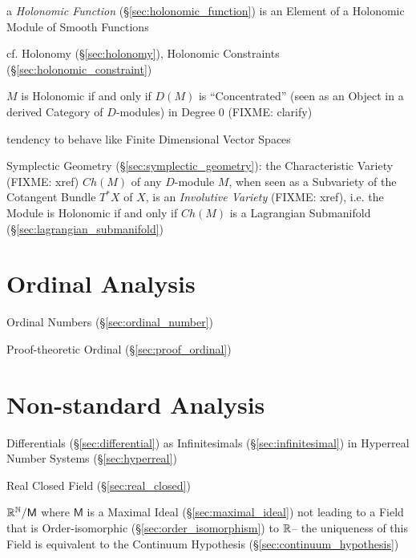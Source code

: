 a \emph{Holonomic Function} (\S\ref{sec:holonomic_function}) is an Element of a
Holonomic Module of Smooth Functions

\fist cf. Holonomy (\S\ref{sec:holonomy}), Holonomic Constraints
(\S\ref{sec:holonomic_constraint})

$M$ is Holonomic if and only if $D(M)$ is ``Concentrated'' (seen as an Object
in a derived Category of $D$-modules) in Degree $0$ (FIXME: clarify)

tendency to behave like Finite Dimensional Vector Spaces

\fist Symplectic Geometry (\S\ref{sec:symplectic_geometry}): the Characteristic
Variety (FIXME: xref) $Ch(M)$ of any $D$-module $M$, when seen as a Subvariety
of the Cotangent Bundle $T^*X$ of $X$, is an \emph{Involutive Variety} (FIXME:
xref), i.e. the Module is Holonomic if and only if $Ch(M)$ is a Lagrangian
Submanifold (\S\ref{sec:lagrangian_submanifold})



\section{Ordinal Analysis}\label{sec:ordinal_analysis}

Ordinal Numbers (\S\ref{sec:ordinal_number})

Proof-theoretic Ordinal (\S\ref{sec:proof_ordinal})



\section{Non-standard Analysis}\label{sec:nonstandard_analysis}

Differentials (\S\ref{sec:differential}) as Infinitesimals
(\S\ref{sec:infinitesimal}) in Hyperreal Number Systems (\S\ref{sec:hyperreal})

Real Closed Field (\S\ref{sec:real_closed})

$\mathbb{R}^{\mathbb{N}} / \mathsf{M}$ where $\mathsf{M}$ is a Maximal Ideal
(\S\ref{sec:maximal_ideal}) not leading to a Field that is
Order-isomorphic (\S\ref{sec:order_isomorphism}) to $\mathbb{R}$-- the
uniqueness of this Field is equivalent to the Continuum Hypothesis
(\S\ref{sec:continuum_hypothesis})




